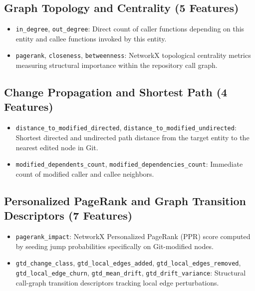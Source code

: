 \documentclass[conference]{IEEEtran}
\begin{document}
\subsection{Graph Topology and Centrality (5 Features)}
\begin{itemize}
    \item \texttt{in\_degree}, \texttt{out\_degree}: Direct count of caller functions depending on this entity and callee functions invoked by this entity.
    \item \texttt{pagerank}, \texttt{closeness}, \texttt{betweenness}: NetworkX topological centrality metrics measuring structural importance within the repository call graph.
\end{itemize}

\subsection{Change Propagation and Shortest Path (4 Features)}
\begin{itemize}
    \item \texttt{distance\_to\_modified\_directed}, \texttt{distance\_to\_modified\_undirected}: Shortest directed and undirected path distance from the target entity to the nearest edited node in Git.
    \item \texttt{modified\_dependents\_count}, \texttt{modified\_dependencies\_count}: Immediate count of modified caller and callee neighbors.
\end{itemize}

\subsection{Personalized PageRank and Graph Transition Descriptors (7 Features)}
\begin{itemize}
    \item \texttt{pagerank\_impact}: NetworkX Personalized PageRank (PPR) score computed by seeding jump probabilities specifically on Git-modified nodes.
    \item \texttt{gtd\_change\_class}, \texttt{gtd\_local\_edges\_added}, \texttt{gtd\_local\_edges\_removed}, \texttt{gtd\_local\_edge\_churn}, \texttt{gtd\_mean\_drift}, \texttt{gtd\_drift\_variance}: Structural call-graph transition descriptors tracking local edge perturbations.
\end{itemize}
\end{document}
